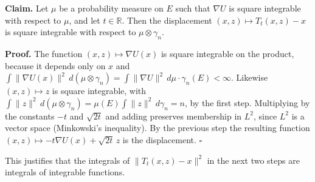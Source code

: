 \documentclass[11pt,a4paper]{article}
\begin{document}
\textbf{Claim.} Let \(\mu\) be a probability measure on \(E\) such that \(\nabla U\) is square integrable with respect to \(\mu\), and let \(t\in\mathbb R\). Then the displacement \((x,z)\mapsto T_t(x,z)-x\) is square integrable with respect to \(\mu\otimes\gamma_n\).




\textbf{Proof.} The function \((x,z)\mapsto\nabla U(x)\) is square integrable on the product, because it depends only on \(x\) and \(\int\|\nabla U(x)\|^2\,d(\mu\otimes\gamma_n)=\int\|\nabla U\|^2\,d\mu\cdot\gamma_n(E)<\infty\). Likewise \((x,z)\mapsto z\) is square integrable, with \(\int\|z\|^2\,d(\mu\otimes\gamma_n)=\mu(E)\int\|z\|^2\,d\gamma_n=n\), by the first step. Multiplying by the constants \(-t\) and \(\sqrt{2t}\) and adding preserves membership in \(L^2\), since \(L^2\) is a vector space (Minkowski's inequality). By the previous step the resulting function \((x,z)\mapsto-t\nabla U(x)+\sqrt{2t}\,z\) is the displacement. \(\square\)




This justifies that the integrals of \(\|T_t(x,z)-x\|^2\) in the next two steps are integrals of integrable functions.
\end{document}
